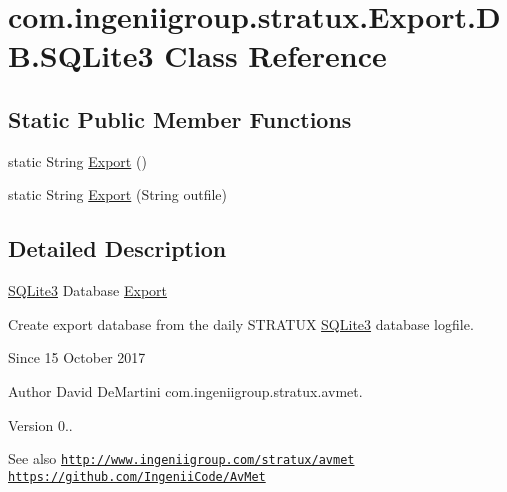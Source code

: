 \hypertarget{classcom_1_1ingeniigroup_1_1stratux_1_1_export_1_1_d_b_1_1_s_q_lite3}{}\section{com.\+ingeniigroup.\+stratux.\+Export.\+D\+B.\+S\+Q\+Lite3 Class Reference}
\label{classcom_1_1ingeniigroup_1_1stratux_1_1_export_1_1_d_b_1_1_s_q_lite3}
\subsection*{Static Public Member Functions}
\begin{DoxyCompactItemize}
\item 
static String \hyperlink{classcom_1_1ingeniigroup_1_1stratux_1_1_export_1_1_d_b_1_1_s_q_lite3_a2c4c68f5c2e4970de5d4010f1667949b}{Export} ()
\item 
static String \hyperlink{classcom_1_1ingeniigroup_1_1stratux_1_1_export_1_1_d_b_1_1_s_q_lite3_a768ac50ab39c72574deba1649aca3d35}{Export} (String outfile)
\end{DoxyCompactItemize}


\subsection{Detailed Description}
\hyperlink{classcom_1_1ingeniigroup_1_1stratux_1_1_export_1_1_d_b_1_1_s_q_lite3}{S\+Q\+Lite3} Database \hyperlink{namespacecom_1_1ingeniigroup_1_1stratux_1_1_export}{Export}

Create export database from the daily S\+T\+R\+A\+T\+UX \hyperlink{classcom_1_1ingeniigroup_1_1stratux_1_1_export_1_1_d_b_1_1_s_q_lite3}{S\+Q\+Lite3} database logfile.

\begin{DoxySince}{Since}
15 October 2017 
\end{DoxySince}
\begin{DoxyAuthor}{Author}
David De\+Martini  com.\+ingeniigroup.\+stratux.\+avmet. 
\end{DoxyAuthor}
\begin{DoxyVersion}{Version}
0.. 
\end{DoxyVersion}
\begin{DoxySeeAlso}{See also}
\href{http://www.ingeniigroup.com/stratux/avmet}{\tt http\+://www.\+ingeniigroup.\+com/stratux/avmet}  \href{https://github.com/IngeniiCode/AvMet}{\tt https\+://github.\+com/\+Ingenii\+Code/\+Av\+Met} 
\end{DoxySeeAlso}



